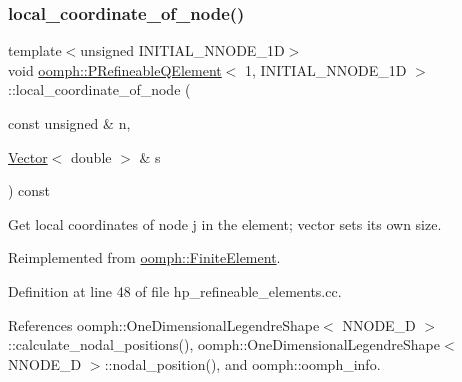 \subsubsection{\texorpdfstring{local\+\_\+coordinate\+\_\+of\+\_\+node()}{local\_coordinate\_of\_node()}}
{\footnotesize\ttfamily template$<$unsigned I\+N\+I\+T\+I\+A\+L\+\_\+\+N\+N\+O\+D\+E\+\_\+1D$>$ \\
void \hyperlink{classoomph_1_1PRefineableQElement}{oomph\+::\+P\+Refineable\+Q\+Element}$<$ 1, I\+N\+I\+T\+I\+A\+L\+\_\+\+N\+N\+O\+D\+E\+\_\+1D $>$\+::local\+\_\+coordinate\+\_\+of\+\_\+node (\begin{DoxyParamCaption}\item[{const unsigned \&}]{n,  }\item[{\hyperlink{classoomph_1_1Vector}{Vector}$<$ double $>$ \&}]{s }\end{DoxyParamCaption}) const\hspace{0.3cm}{\ttfamily [virtual]}}



Get local coordinates of node j in the element; vector sets its own size. 



Reimplemented from \hyperlink{classoomph_1_1FiniteElement_a22bc4ee35e4f948d8d7fba18c7b4f4c4}{oomph\+::\+Finite\+Element}.



Definition at line 48 of file hp\+\_\+refineable\+\_\+elements.\+cc.



References oomph\+::\+One\+Dimensional\+Legendre\+Shape$<$ N\+N\+O\+D\+E\+\_\+D $>$\+::calculate\+\_\+nodal\+\_\+positions(), oomph\+::\+One\+Dimensional\+Legendre\+Shape$<$ N\+N\+O\+D\+E\+\_\+D $>$\+::nodal\+\_\+position(), and oomph\+::oomph\+\_\+info.

\mbox{\label{classoomph_1_1PRefineableQElement_3_011_00_01INITIAL__NNODE__1D_01_4_a356f8d8fbe63009336b1c77787f419b7}} 
